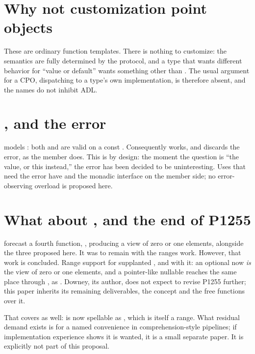 \documentclass[a4paper,10pt,oneside,openany,final,article]{memoir}
\begin{document}
\section{Why not customization point objects}

These are ordinary function templates. There is nothing to customize: the semantics are fully determined
by the protocol, and a type that wants different behavior for ``value or
default'' wants something other than . The usual
argument for a CPO, dispatching to a type's own implementation, is
therefore absent, and the names do not inhibit ADL.

\section{, and the error}

 models : both 
and  are valid on a const . Consequently
 works, and discards the error, as the member
 does. This is by design: the moment the question is ``the
value, or this instead,'' the error has been decided to be uninteresting.
Uses that need the error have  and the monadic interface on
the member side; no error-observing overload is proposed here.

\section{What about , and the end of P1255}

\cite{P2988R12} forecast a fourth function, , producing a
view of zero or one elements, alongside the three proposed here. It was to
remain with the \cite{P1255R13} ranges work. However, that work is concluded.
Range support for  \cite{P3168R2} supplanted
, and  with it: an optional now
\emph{is} the view of zero or one elements, and a pointer-like nullable
reaches the same place through  \cite{P2988R12}, as
. Downey, its author, does not expect
to revise P1255 further; this paper inherits its remaining deliverables, the
concept and the free functions over it.

That covers  as well:  is now
spellable as , which is itself a
range. What residual demand exists is for a named convenience in
comprehension-style pipelines; if implementation experience shows it is
wanted, it is a small separate paper. It is explicitly not part of this
proposal.
\end{document}

